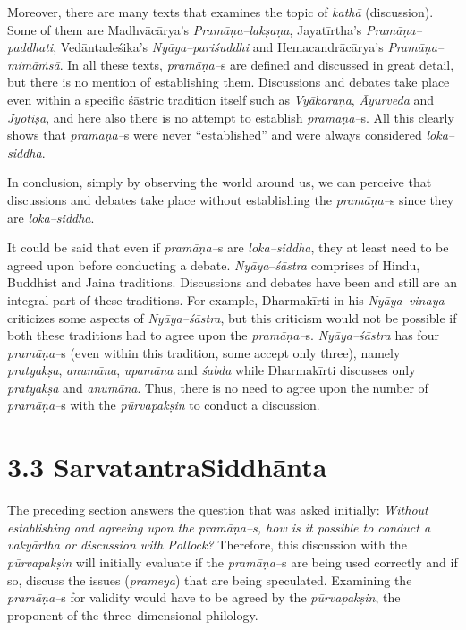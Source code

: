 Moreover, there are many texts that examines the topic of \textit{kathā} (discussion). Some of them are Madhvācārya’s \textit{Pramāṇa–lakṣaṇa}, Jayatīrtha’s \textit{Pramāṇa–paddhati}, Vedāntadeśika’s \textit{Nyāya–pariśuddhi} and Hemacandrācārya’s \textit{Pramāṇa–mimāṁsā}. In all these texts, \textit{pramāṇa–}s are defined and discussed in great detail, but there is no mention of establishing them. Discussions and debates take place even within a specific śāstric tradition itself such as \textit{Vyākaraṇa}, \textit{Āyurveda} and \textit{Jyotiṣa}, and here also there is no attempt to establish \textit{pramāṇa–}s. All this clearly shows that \textit{pramāṇa–}s were never “established” and were always considered \textit{loka–siddha}.

In conclusion, simply by observing the world around us, we can perceive that discussions and debates take place without establishing the \textit{pramāṇa–}s since they are \textit{loka–siddha}.

It could be said that even if \textit{pramāṇa–}s are \textit{loka–siddha}, they at least need to be agreed upon before conducting a debate. \textit{Nyāya}–\textit{śāstra} comprises of Hindu, Buddhist and Jaina traditions. Discussions and debates have been and still are an integral part of these traditions. For example, Dharmakīrti in his \textit{Nyāya–vinaya} criticizes some aspects of \textit{Nyāya–śāstra}, but this criticism would not be possible if both these traditions had to agree upon the \textit{pramāṇa–}s. \textit{Nyāya–śāstra} has four \textit{pramāṇa–}s (even within this tradition, some accept only three), namely \textit{pratyakṣa}, \textit{anumāna}, \textit{upamāna} and \textit{śabda} while Dharmakīrti discusses only \textit{pratyakṣa} and \textit{anumāna}. Thus, there is no need to agree upon the number of \textit{pramāṇa–}s with the \textit{pūrvapakṣin} to conduct a discussion.


\section*{3.3 SarvatantraSiddhānta}

The preceding section answers the question that was asked initially: \textit{Without establishing and agreeing upon the pramāṇa–s, how is it possible to conduct a vakyārtha or discussion with Pollock? }Therefore, this discussion with the \textit{pūrvapakṣin} will initially evaluate if the \textit{pramāṇa–}s are being used correctly and if so, discuss the issues (\textit{prameya}) that are being speculated. Examining the \textit{pramāṇa–}s for validity would have to be agreed by the \textit{pūrvapakṣin}, the proponent of the three–dimensional philology.

